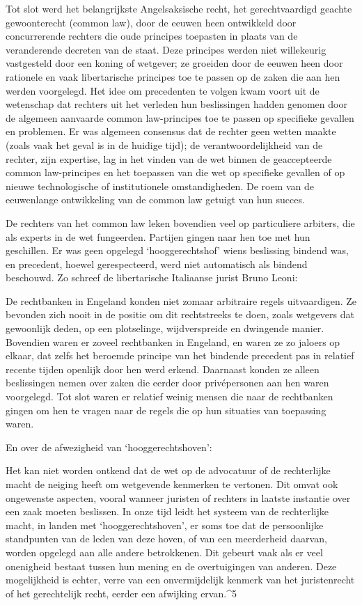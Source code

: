 \documentclass[
  a5paper,
  smalldemyvopaper,10pt,twoside,onecolumn,openright,extrafontsizes,hidelinks]{memoir}
\renewenvironment{quote}%
               {\list{}{\rightmargin=.6cm\leftmargin=.6cm}%
                \itshape \item[]}%
               {\endlist}
\begin{document}
Tot slot werd het belangrijkste Angelsaksische recht, het
gerechtvaardigd geachte gewoonterecht (common law), door de eeuwen heen
ontwikkeld door concurrerende rechters die oude principes toepasten in
plaats van de veranderende decreten van de staat. Deze principes werden
niet willekeurig vastgesteld door een koning of wetgever; ze groeiden
door de eeuwen heen door rationele en vaak libertarische principes toe
te passen op de zaken die aan hen werden voorgelegd. Het idee om
precedenten te volgen kwam voort uit de wetenschap dat rechters uit het
verleden hun beslissingen hadden genomen door de algemeen aanvaarde
common law-principes toe te passen op specifieke gevallen en problemen.
Er was algemeen consensus dat de rechter geen wetten maakte (zoals vaak
het geval is in de huidige tijd); de verantwoordelijkheid van de
rechter, zijn expertise, lag in het vinden van de wet binnen de
geaccepteerde common law-principes en het toepassen van die wet op
specifieke gevallen of op nieuwe technologische of institutionele
omstandigheden. De roem van de eeuwenlange ontwikkeling van de common
law getuigt van hun succes.

De rechters van het common law leken bovendien veel op particuliere
arbiters, die als experts in de wet fungeerden. Partijen gingen naar hen
toe met hun geschillen. Er was geen opgelegd `hooggerechtshof' wiens
beslissing bindend was, en precedent, hoewel gerespecteerd, werd niet
automatisch als bindend beschouwd. Zo schreef de libertarische
Italiaanse jurist Bruno Leoni:

\begin{quote}
De rechtbanken in Engeland konden niet zomaar arbitraire regels
uitvaardigen. Ze bevonden zich nooit in de positie om dit rechtstreeks
te doen, zoals wetgevers dat gewoonlijk deden, op een plotselinge,
wijdverspreide en dwingende manier. Bovendien waren er zoveel
rechtbanken in Engeland, en waren ze zo jaloers op elkaar, dat zelfs het
beroemde principe van het bindende precedent pas in relatief recente
tijden openlijk door hen werd erkend. Daarnaast konden ze alleen
beslissingen nemen over zaken die eerder door privépersonen aan hen
waren voorgelegd. Tot slot waren er relatief weinig mensen die naar de
rechtbanken gingen om hen te vragen naar de regels die op hun situaties
van toepassing waren.

En over de afwezigheid van `hooggerechtshoven':

Het kan niet worden ontkend dat de wet op de advocatuur of de
rechterlijke macht de neiging heeft om wetgevende kenmerken te vertonen.
Dit omvat ook ongewenste aspecten, vooral wanneer juristen of rechters
in laatste instantie over een zaak moeten beslissen. In onze tijd leidt
het systeem van de rechterlijke macht, in landen met
`hooggerechtshoven', er soms toe dat de persoonlijke standpunten van de
leden van deze hoven, of van een meerderheid daarvan, worden opgelegd
aan alle andere betrokkenen. Dit gebeurt vaak als er veel onenigheid
bestaat tussen hun mening en de overtuigingen van anderen. Deze
mogelijkheid is echter, verre van een onvermijdelijk kenmerk van het
juristenrecht of het gerechtelijk recht, eerder een afwijking
ervan.\^{}5
\end{quote}
\end{document}
